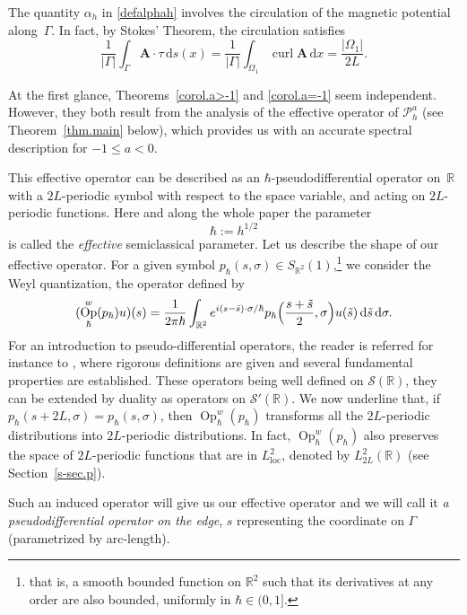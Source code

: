 \documentclass[JEP,XML,SOM,Unicode,NoFloatCountersInSection,published]{cedram}
\newcommand{\rd}{\,\mathrm{d}}
\newcommand{\loc}{\mathrm{loc}}
\DeclareMathOperator{\curl}{curl}
\DeclareMathOperator{\Op}{Op}
\newcommand{\cP}{\mathcal{P}}
\theoremstyle{plain}
\theoremstyle{definition}
\newcommand{\A}{\boldsymbol{A}}
\newcommand{\R}{\mathbb{R}}
\begin{document}
The quantity $\alpha_h$ in \eqref{defalphah} involves the circulation of the magnetic potential along~$\Gamma$. In fact, by Stokes' Theorem, the circulation satisfies
\[
\frac1{|\Gamma|}\int_\Gamma \A\cdot \tau \rd s(x)=\frac1{|\Gamma|}\int_{\Omega_1} \curl\A \rd x= \frac{|\Omega_1|}{2L}.
\]

At the first glance, Theorems~\ref{corol.a>-1} and \ref{corol.a=-1} seem independent. However, they both result from the analysis of the effective operator of $\cP_h^a$ (see Theorem~\ref{thm.main} below), which provides us with an accurate spectral description for $-1\leq a<0$.

This effective operator can be described as an $\hbar$-pseudodifferential operator on~$\R$ with a $2L$-periodic symbol with respect to the space variable, and acting on $2L$\nobreakdash-periodic functions. Here and along the whole paper the parameter
\begin{equation}
\hbar:=h^{1/2}
\end{equation}
is called the \emph{effective} semiclassical parameter. Let us describe the shape of our effective operator. For a given symbol $p_\hbar(s,\sigma)\in S_{\R^2}(1)$,\footnote{that is, a smooth bounded function on $\R^2$ such that its derivatives at any order are also bounded, uniformly in $\hbar\in(0,1]$.} we consider the Weyl quantization, \ie the operator defined by
\begin{equation}\label{eq.ph-w-intro}
(\Op_\hbar^w(p_\hbar) u)(s)=\frac{1}{2\pi\hbar} \int_{\R^2} e^{i(s-\tilde s)\cdot \sigma/\hbar} p_\hbar \Bigl(\frac{s+\tilde s}{2}, \sigma\Bigr)u(\tilde s) \rd \tilde s \rd \sigma.
\end{equation}
For an introduction to pseudo-differential operators, the reader is referred for instance to \cite{Zworski}, where rigorous definitions are given and several fundamental properties are established. These operators being well defined on $\mathcal S(\mathbb R)$, they can be extended by duality as operators on $\mathcal S'(\mathbb R)$. We now underline that, if $p_{\hbar}(s+2L,\sigma)=p_{\hbar}(s,\sigma)$, then $\Op_\hbar^w(p_\hbar)$ transforms all the $2L$-periodic distributions into $2L$-periodic distributions. In fact, $\Op_\hbar^w(p_\hbar)$ also preserves the space of $2L$-periodic functions that are in $L^2_{\loc}$, denoted by $L^2_{2L}(\R)$ (see Section~\ref{s-sec.p}).

Such an induced operator will give us our effective operator and we will call it \emph{a pseudodifferential operator on the edge}, $s$ representing the coordinate on $\Gamma$ (parametrized by arc-length).
\end{document}
